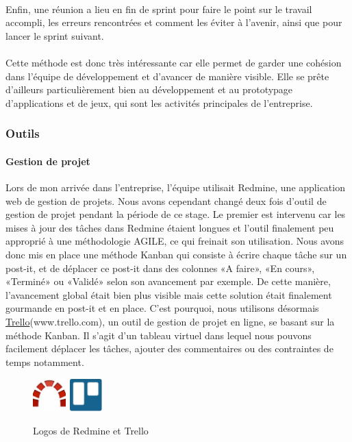 \paragraph{}Enfin, une réunion a lieu en fin de sprint pour faire le point sur le travail accompli, les erreurs rencontrées et comment les éviter à l'avenir, ainsi que pour lancer le sprint suivant.

\paragraph{}Cette méthode est donc très intéressante car elle permet de garder une cohésion dans l’équipe de développement et d’avancer de manière visible.  Elle se prête d'ailleurs particulièrement bien au développement et au prototypage d'applications et de jeux, qui sont les activités principales de l'entreprise.

	\subsubsection{Outils}
		\paragraph{Gestion de projet\\}
Lors de mon arrivée dans l'entreprise, l’équipe utilisait Redmine, une application web de gestion de projets. Nous avons cependant changé deux fois d'outil de gestion de projet pendant la période de ce stage. Le premier est intervenu car les mises à jour des tâches dans Redmine étaient longues et l'outil finalement peu approprié à une méthodologie AGILE, ce qui freinait son utilisation. Nous avons donc mis en place une méthode Kanban qui consiste à écrire chaque tâche sur un post-it, et de déplacer ce post-it dans des colonnes «A faire», «En cours», «Terminé» ou «Validé» selon son avancement par exemple. De cette manière, l’avancement global était bien plus visible mais cette solution était finalement gourmande en post-it et en place. C'est pourquoi, nous utilisons désormais \href{www.trello.com}{Trello}(www.trello.com), un outil de gestion de projet en ligne, se basant sur la méthode Kanban. Il s’agit d’un tableau virtuel dans lequel nous pouvons facilement déplacer les tâches, ajouter des commentaires ou des contraintes de temps notamment.

	\begin{figure}[!h]
		\centering
		\includegraphics[height=48px]{images/redmine.jpg}
		\includegraphics[height=48px]{images/trello.jpg}
		\caption{Logos de Redmine et Trello}
		\label{logos_redmine_trello}
	\end{figure}
 \newpage
